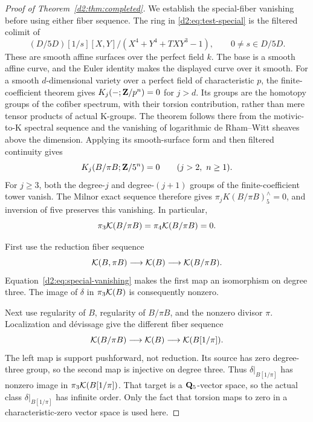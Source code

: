 \begin{proof}[Proof of Theorem~\ref{d2:thm:completed}]
We establish the special-fiber vanishing before using either fiber
sequence.
The ring in \eqref{d2:eq:test-special} is the filtered colimit of
\[
 (D/5D)[1/s][X,Y]/(X^4+Y^4+TXY^3-1),
 \qquad 0\ne s\in D/5D.
\]
These are smooth affine surfaces over the perfect field \(k\).
The base is a smooth affine curve, and the Euler identity makes
the displayed curve over it smooth.
For a smooth \(d\)-dimensional variety over a perfect field of
characteristic \(p\), the finite-coefficient theorem
\cite[Theorem~8.4]{GeisserLevineCharP} gives
\(K_j(-;\mathbf{Z}/p^n)=0\) for \(j>d\).
Its groups are the homotopy groups of the cofiber spectrum, with
their torsion contribution, rather than mere tensor products of
actual K-groups.
The theorem follows there from the motivic-to-K spectral sequence
and the vanishing of logarithmic de Rham--Witt sheaves above the
dimension.
Applying its smooth-surface form and then filtered continuity gives
\[
 K_j(B/\pi B;\mathbf{Z}/5^n)=0
 \qquad(j>2,\ n\ge1).
\]
For \(j\ge3\), both the degree-\(j\) and degree-\((j+1)\) groups
of the finite-coefficient tower vanish.
The Milnor exact sequence therefore gives
\(\pi_jK(B/\pi B)^\wedge_5=0\), and inversion of five preserves
this vanishing. In particular,
\begin{equation}\label{d2:eq:special-vanishing}
 \pi_3\mathcal K(B/\pi B)=\pi_4\mathcal K(B/\pi B)=0.
\end{equation}

First use the reduction fiber sequence
\begin{equation}\label{d2:eq:reduction-fiber}
 \mathcal K(B,\pi B)\longrightarrow\mathcal K(B)
                  \longrightarrow\mathcal K(B/\pi B).
\end{equation}
Equation~\eqref{d2:eq:special-vanishing} makes the first map an
isomorphism on degree three.
The image of \(\delta\) in \(\pi_3\mathcal K(B)\) is consequently nonzero.

Next use regularity of \(B\), regularity of \(B/\pi B\), and
the nonzero divisor \(\pi\).
Localization and d\'evissage
\cite[V.4.1, V.6.1]{Weibel} give the different fiber sequence
\begin{equation}\label{d2:eq:localization-fiber}
 \mathcal K(B/\pi B)\longrightarrow\mathcal K(B)
                         \longrightarrow\mathcal K(B[1/\pi]).
\end{equation}
The left map is support pushforward, not reduction.
Its source has zero degree-three group, so the second map is
injective on degree three.
Thus \(\delta|_{B[1/\pi]}\) has nonzero image in
\(\pi_3\mathcal K(B[1/\pi])\).
That target is a \(\mathbf{Q}_5\)-vector space, so the actual class
\(\delta|_{B[1/\pi]}\) has infinite order.
Only the fact that torsion maps to zero in a characteristic-zero
vector space is used here.


\end{proof}
